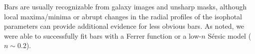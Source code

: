 \documentclass[preprint2]{emulateapj}
\begin{document}
Bars are usually recognizable from galaxy images and unsharp masks, 
although local maxima/minima or abrupt changes in the radial profiles of the isophotal parameters 
can provide additional evidence for less obvious bars. 
As noted, we were able to successfully fit bars with a Ferrer function or a low-$n$ S\'ersic model ($n \sim 0.2$). \\
\end{document}
